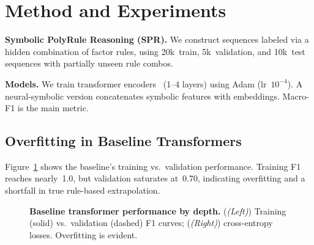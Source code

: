 \documentclass{article} %
\renewcommand{\figleft}{{\em (Left)\/}}
\renewcommand{\figright}{{\em (Right)\/}}
\begin{document}
\section{Method and Experiments}
\textbf{Symbolic PolyRule Reasoning (SPR).} We construct sequences labeled via a hidden combination of factor rules, using 20k~train, 5k~validation, and 10k~test sequences with partially unseen rule combos.

\textbf{Models.} We train transformer encoders~\citep{vaswani2017attentionia} (1--4 layers) using Adam (lr~$10^{-4}$). A neural-symbolic version concatenates symbolic features with embeddings. Macro-F1 is the main metric.

\subsection{Overfitting in Baseline Transformers}
Figure~\ref{fig:baseline_curves} shows the baseline's training vs.\ validation performance. Training F1 reaches nearly~1.0, but validation saturates at~0.70, indicating overfitting and a shortfall in true rule-based extrapolation.

\begin{figure}[t]
\centering
{}
\caption{\textbf{Baseline transformer performance by depth.} (\figleft) Training (solid) vs.\ validation (dashed) F1 curves; (\figright) cross-entropy losses. Overfitting is evident.}
\label{fig:baseline_curves}
\end{figure}
\end{document}
